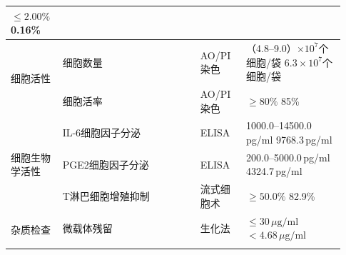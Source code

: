 \documentclass[UTF8,10pt,a4paper,fontset=fandol]{ctexart}
\newcommand{\fieldvalue}[1]{#1}
\begin{document}
\begin{tabular}{|p{0.13\linewidth}|p{0.39\linewidth}|p{0.13\linewidth}|p{0.28\linewidth}|}
\fieldvalue{$\leq 2.00\%$}
\quad
\fieldvalue{0.16\%}
\\ \hline
\multirow{2}{*}{细胞活性} &
\fieldvalue{细胞数量} &
\fieldvalue{AO/PI染色} &
\fieldvalue{（4.8--9.0）$\times10^{7}$个细胞/袋}
\quad
\fieldvalue{$6.3\times10^{7}$个细胞/袋}
\\ \cline{2-4}
&
\fieldvalue{细胞活率} &
\fieldvalue{AO/PI染色} &
\fieldvalue{$\geq 80\%$}
\quad
\fieldvalue{85\%}
\\ \hline
\multirow{3}{*}{细胞生物学活性} &
\fieldvalue{IL-6细胞因子分泌} &
\fieldvalue{ELISA} &
\fieldvalue{1000.0--14500.0\,pg/ml}
\quad
\fieldvalue{9768.3\,pg/ml}
\\ \cline{2-4}
&
\fieldvalue{PGE2细胞因子分泌} &
\fieldvalue{ELISA} &
\fieldvalue{200.0--5000.0\,pg/ml}
\quad
\fieldvalue{4324.7\,pg/ml}
\\ \cline{2-4}
&
\fieldvalue{T淋巴细胞增殖抑制} &
\fieldvalue{流式细胞术} &
\fieldvalue{$\geq 50.0\%$}
\quad
\fieldvalue{82.9\%}
\\ \hline
\multirow{2}{*}{杂质检查} &
\fieldvalue{微载体残留} &
\fieldvalue{生化法} &
\fieldvalue{$\leq 30\,\mu\mathrm{g}/\mathrm{ml}$}
\quad
\fieldvalue{$<4.68\,\mu\mathrm{g}/\mathrm{ml}$}
\\ \cline{2-4}

\end{tabular}
\end{document}
